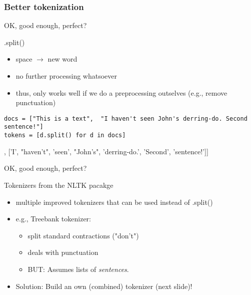 \subsubsection{Better tokenization}

\begin{frame}[fragile]{OK, good enough, perfect?}
\begin{block}{.split()}
\begin{itemize}
	\item space $\rightarrow$ new word
	\item no further processing whatsoever
	\item thus, only works well if we do a preprocessing outselves (e.g., remove punctuation)
\end{itemize}
\end{block}
\begin{lstlisting}
docs = ["This is a text",  "I haven't seen John's derring-do. Second sentence!"]
tokens = [d.split() for d in docs]
\end{lstlisting}
\begin{lstlistingoutputtiny}
[['This', 'is', 'a', 'text'], ['I', "haven't", 'seen', "John's", 'derring-do.', 'Second', 'sentence!']]
\end{lstlistingoutputtiny}
\end{frame}


\begin{frame}{OK, good enough, perfect?}
  \begin{block}{Tokenizers from the NLTK pacakge}
    \begin{itemize}
    \item multiple improved tokenizers that can be used instead of .split()
    \item e.g., Treebank tokenizer:
      \begin{itemize}
      \item split standard contractions ("don't")
      \item deals with punctuation
      \item BUT: Assumes lists of \emph{sentences}.
      \end{itemize}
    \item Solution: Build an own (combined) tokenizer (next slide)!
    \end{itemize}
  \end{block}
\end{frame}


